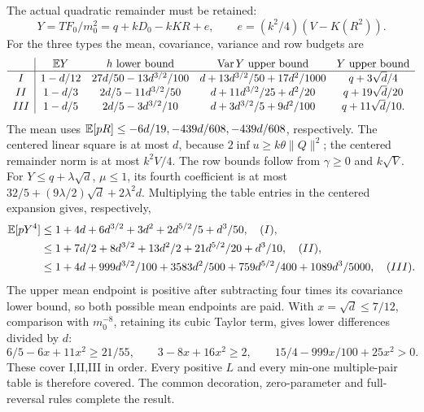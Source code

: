 The actual quadratic remainder must be retained:
\[
 Y=TF_0/m_0^2=q+kD_0-kKR+e,\qquad
 e=(k^2/4)(V-K(R^2)).
\]
For the three types the mean, covariance, variance and row budgets are
\[
\begin{array}{c|cccc}
 &\mathbb E Y&h\text{ lower bound}&\operatorname{Var}Y\text{ upper bound}&Y\text{ upper bound}\\\hline
I&1-d/12&27d/50-13d^{3/2}/100&d+13d^{3/2}/50+17d^2/1000&q+3\sqrt d/4\\
II&1-d/3&2d/5-11d^{3/2}/50&d+11d^{3/2}/25+d^2/20&q+19\sqrt d/20\\
III&1-d/5&2d/5-3d^{3/2}/10&d+3d^{3/2}/5+9d^2/100&q+11\sqrt d/10.
\end{array}
\]
The mean uses $\mathbb E[pR]\le-6d/19,-439d/608,-439d/608$,
respectively. The centered linear square is at most $d$, because
$2\inf u\ge k\theta\|Q\|^2$; the centered remainder norm is at most
$k^2V/4$. The row bounds follow from $\gamma\ge0$ and $k\sqrt V$.
For $Y\le q+\lambda\sqrt d$, $\mu\le1$, its fourth coefficient is
at most $32/5+(9\lambda/2)\sqrt d+2\lambda^2d$.
Multiplying the table entries in the centered expansion gives, respectively,
\begin{align*}
\mathbb E[pY^4]&\le1+4d+6d^{3/2}+3d^2+2d^{5/2}/5+d^3/50,\quad(I),\\
&\le1+7d/2+8d^{3/2}+13d^2/2+21d^{5/2}/20+d^3/10,\quad(II),\\
&\le1+4d+999d^{3/2}/100+3583d^2/500
                          +759d^{5/2}/400+1089d^3/5000,\quad(III).
\end{align*}
The upper mean endpoint is positive after subtracting four times its
covariance lower bound, so both possible mean endpoints are paid.
With $x=\sqrt d\le7/12$, comparison with $m_0^{-8}$, retaining its
cubic Taylor term, gives lower differences divided by $d$:
\[
 6/5-6x+11x^2\ge21/55,\qquad
 3-8x+16x^2\ge2,\qquad
 15/4-999x/100+25x^2>0.
\]
These cover I,II,III in order. Every positive $L$ and every min-one
multiple-pair table is therefore covered. The common decoration,
zero-parameter and full-reversal rules complete the result.
